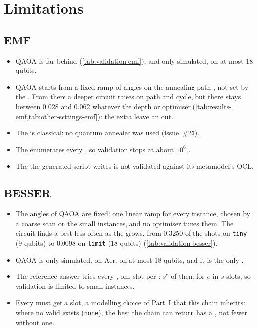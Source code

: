 \documentclass{article}
\begin{document}




\section{Limitations}\label{sec:limitations}

\subsection*{EMF}

\begin{itemize}[nosep]
	\item QAOA is far behind  (\cref{tab:validation-emf}), and only simulated, on at
	      most 18 qubits.
	\item QAOA starts from a fixed ramp of angles on the annealing path \cite[§VI]{Farhi}, not set by the
	      . From there a deeper circuit raises  on path and cycle, but
	      there  stays between 0.028 and 0.062 whatever the depth or optimiser
	      (\cref{tab:results-emf,tab:other-settings-emf}): the extra   leave an  out.
	\item The  is classical: no quantum annealer was used (issue~\#23).
	\item The  enumerates every , so validation stops at about $10^6$ .
	\item The  the generated script writes is not validated against its metamodel's OCL.
\end{itemize}

\subsection*{BESSER}

\begin{itemize}[nosep]
	\item The angles of QAOA are fixed: one linear ramp for every instance, chosen by a coarse scan on the small
	      instances, and no optimiser tunes them. The circuit finds a best  less often as the
	       grows, from 0.3250 of the shots on \texttt{tiny} (9 qubits) to 0.0098 on \texttt{limit}
	      (18 qubits) (\cref{tab:validation-besser}).
	\item QAOA is only simulated, on Aer, on at most 18 qubits, and it is the only .
	\item The reference answer tries every , one slot per : $s^e$ of them for $e$
	       in $s$ slots, so validation is limited to small instances.
	\item Every  must get a slot, a modelling choice of Part~I that this chain inherits: where no valid
	       exists (\texttt{none}), the best the chain can return has a , not fewer
	       without one.
\end{itemize}
\end{document}
